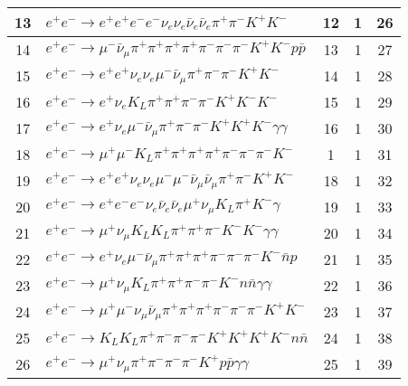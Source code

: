 \documentclass[landscape]{article}
\begin{document}
\begin{table}[htbp!]
\begin{tabular}{|c|>{\centering}p{18cm}|c|c|c|}
\hline
13 & $ e^{+} e^{-} \rightarrow e^{+} e^{+} e^{-} e^{-} \nu_{e} \nu_{e} \bar{\nu}_{e} \bar{\nu}_{e} \pi^{+} \pi^{-} K^{+} K^{-} $ & 12 & 1 & 26 \\
\hline
14 & $ e^{+} e^{-} \rightarrow \mu^{-} \bar{\nu}_{\mu} \pi^{+} \pi^{+} \pi^{+} \pi^{+} \pi^{-} \pi^{-} \pi^{-} K^{+} K^{-} p \bar{p} $ & 13 & 1 & 27 \\
\hline
15 & $ e^{+} e^{-} \rightarrow e^{+} e^{+} \nu_{e} \nu_{e} \mu^{-} \bar{\nu}_{\mu} \pi^{+} \pi^{-} \pi^{-} K^{+} K^{-} $ & 14 & 1 & 28 \\
\hline
16 & $ e^{+} e^{-} \rightarrow e^{+} \nu_{e} K_{L} \pi^{+} \pi^{+} \pi^{-} \pi^{-} K^{+} K^{-} K^{-} $ & 15 & 1 & 29 \\
\hline
17 & $ e^{+} e^{-} \rightarrow e^{+} \nu_{e} \mu^{-} \bar{\nu}_{\mu} \pi^{+} \pi^{-} \pi^{-} K^{+} K^{+} K^{-} \gamma \gamma $ & 16 & 1 & 30 \\
\hline
18 & $ e^{+} e^{-} \rightarrow \mu^{+} \mu^{-} K_{L} \pi^{+} \pi^{+} \pi^{+} \pi^{+} \pi^{-} \pi^{-} \pi^{-} K^{-} $ & 1 & 1 & 31 \\
\hline
19 & $ e^{+} e^{-} \rightarrow e^{+} e^{+} \nu_{e} \nu_{e} \mu^{-} \mu^{-} \bar{\nu}_{\mu} \bar{\nu}_{\mu} \pi^{+} \pi^{-} K^{+} K^{-} $ & 18 & 1 & 32 \\
\hline
20 & $ e^{+} e^{-} \rightarrow e^{+} e^{-} e^{-} \nu_{e} \bar{\nu}_{e} \bar{\nu}_{e} \mu^{+} \nu_{\mu} K_{L} \pi^{+} K^{-} \gamma $ & 19 & 1 & 33 \\
\hline
21 & $ e^{+} e^{-} \rightarrow \mu^{+} \nu_{\mu} K_{L} K_{L} \pi^{+} \pi^{+} \pi^{-} K^{-} K^{-} \gamma \gamma $ & 20 & 1 & 34 \\
\hline
22 & $ e^{+} e^{-} \rightarrow e^{+} \nu_{e} \mu^{-} \bar{\nu}_{\mu} \pi^{+} \pi^{+} \pi^{+} \pi^{-} \pi^{-} \pi^{-} K^{-} \bar{n} p $ & 21 & 1 & 35 \\
\hline
23 & $ e^{+} e^{-} \rightarrow \mu^{+} \nu_{\mu} K_{L} \pi^{+} \pi^{+} \pi^{-} \pi^{-} K^{-} n \bar{n} \gamma \gamma $ & 22 & 1 & 36 \\
\hline
24 & $ e^{+} e^{-} \rightarrow \mu^{+} \mu^{-} \nu_{\mu} \bar{\nu}_{\mu} \pi^{+} \pi^{+} \pi^{+} \pi^{-} \pi^{-} \pi^{-} K^{+} K^{-} $ & 23 & 1 & 37 \\
\hline
25 & $ e^{+} e^{-} \rightarrow K_{L} K_{L} \pi^{+} \pi^{-} \pi^{-} \pi^{-} K^{+} K^{+} K^{+} K^{-} n \bar{n} $ & 24 & 1 & 38 \\
\hline
26 & $ e^{+} e^{-} \rightarrow \mu^{+} \nu_{\mu} \pi^{+} \pi^{-} \pi^{-} \pi^{-} K^{+} p \bar{p} \gamma \gamma $ & 25 & 1 & 39 \\

\end{tabular}
\end{table}
\end{document}
